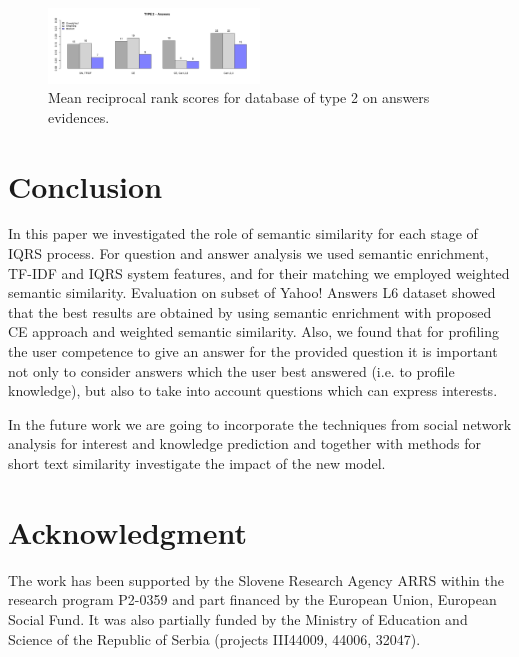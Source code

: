 \documentclass[conference]{IEEEtran}
\begin{document}
\begin{figure}[!t]
	\setlength{\belowcaptionskip}{-15pt}
	\setlength{\abovecaptionskip}{-10pt}
	\centering
	\includegraphics[width=0.5\textwidth]{mrrType2Answers.pdf}
	\caption{Mean reciprocal rank scores for database of type 2 on answers evidences.}
	\label{fig:mrrtype2}
\end{figure}
\vspace{-0.3cm}
\section{Conclusion}
\label{sec:conclusion}
In this paper we investigated the role of semantic similarity for each stage of IQRS process. For question and answer analysis we used semantic enrichment, TF-IDF and IQRS system features, and for their matching we employed weighted semantic similarity. Evaluation on subset of Yahoo! Answers L6 dataset showed that the best results are obtained by using semantic enrichment with proposed CE approach and weighted semantic similarity. Also, we found that for profiling the user competence to give an answer for the provided question it is important not only to consider answers which the user best answered (i.e. to profile knowledge), but also to take into account  questions which can express interests.

In the future work we are going to incorporate the techniques from social network analysis for interest and knowledge prediction and together with methods for short text similarity investigate the impact of the new model.






\vspace{-0.3cm}
\section*{Acknowledgment}
The work has been supported by the Slovene Research Agency ARRS within the research program P2-0359 and part financed by the European Union, European Social Fund. It was also partially funded by the Ministry of Education and Science of the Republic of Serbia (projects III44009, 44006, 32047).
\end{document}
